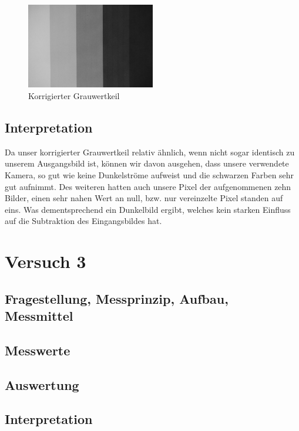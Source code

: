 \documentclass[12pt, oneside, a4paper, \docLanguage]{report}
\begin{document}
\begin{figure}[H]
	\centering\small
	\includegraphics[width=0.5\textwidth]{media/subGrayIntImage_versuch2.png}
	\caption{Korrigierter Grauwertkeil}
	\label{fig:VERSUCH_2_MESSWERTE_CORRECTED}
\end{figure}

\section{Interpretation}
\label{chap:VERSUCH_2_INTERPRETATION}
Da unser korrigierter Grauwertkeil relativ ähnlich, wenn nicht sogar identisch zu unserem Ausgangsbild ist, können wir davon ausgehen, dass unsere verwendete Kamera, so gut wie keine Dunkelströme aufweist und die schwarzen Farben sehr gut aufnimmt. Des weiteren hatten auch unsere Pixel der aufgenommenen zehn Bilder, einen sehr nahen Wert an null, bzw. nur vereinzelte Pixel standen auf eins. Was dementsprechend ein Dunkelbild ergibt, welches kein starken Einfluss auf die Subtraktion des Eingangsbildes hat.
%
%
\chapter{Versuch 3}
\label{chap:VERSUCH_3}

\section{Fragestellung, Messprinzip, Aufbau, Messmittel}
\label{chap:VERSUCH_3_FRAGESTELLUNG}

\section{Messwerte}
\label{chap:VERSUCH_3_MESSWERTE}

\section{Auswertung}
\label{chap:VERSUCH_3_AUSWERTUNG}

\section{Interpretation}
\label{chap:VERSUCH_3_INTERPRETATION}
\end{document}
